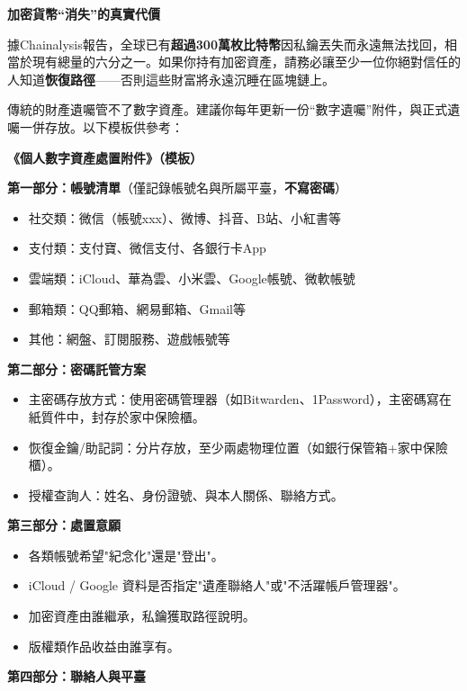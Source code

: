 \textbf{加密貨幣“消失”的真實代價}\par

據Chainalysis報告，全球已有\textbf{超過300萬枚比特幣}因私鑰丟失而永遠無法找回，相當於現有總量的六分之一。如果你持有加密資產，請務必讓至少一位你絕對信任的人知道\textbf{恢復路徑}——否則這些財富將永遠沉睡在區塊鏈上。


傳統的財產遺囑管不了數字資產。建議你每年更新一份“數字遺囑”附件，與正式遺囑一併存放。以下模板供參考：

\textbf{《個人數字資產處置附件》（模板）}\par

\textbf{第一部分：帳號清單}（僅記錄帳號名與所屬平臺，\textbf{不寫密碼}）

\begin{itemize}
  \item 社交類：微信（帳號xxx）、微博、抖音、B站、小紅書等
  \item 支付類：支付寶、微信支付、各銀行卡App
  \item 雲端類：iCloud、華為雲、小米雲、Google帳號、微軟帳號
  \item 郵箱類：QQ郵箱、網易郵箱、Gmail等
  \item 其他：網盤、訂閱服務、遊戲帳號等
\end{itemize}

\textbf{第二部分：密碼託管方案}

\begin{itemize}
  \item 主密碼存放方式：使用密碼管理器（如Bitwarden、1Password），主密碼寫在紙質件中，封存於家中保險櫃。
  \item 恢復金鑰/助記詞：分片存放，至少兩處物理位置（如銀行保管箱+家中保險櫃）。
  \item 授權查詢人：姓名、身份證號、與本人關係、聯絡方式。
\end{itemize}

\textbf{第三部分：處置意願}

\begin{itemize}
  \item 各類帳號希望"紀念化"還是"登出"。
  \item iCloud / Google 資料是否指定"遺產聯絡人"或"不活躍帳戶管理器"。
  \item 加密資產由誰繼承，私鑰獲取路徑說明。
  \item 版權類作品收益由誰享有。
\end{itemize}

\textbf{第四部分：聯絡人與平臺}

